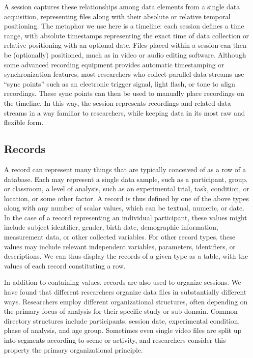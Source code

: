 \documentclass{sig-alternate}
\begin{document}
A session captures these relationships among data elements from a single data acquisition, representing files along with their absolute or relative temporal positioning.
The metaphor we use here is a timeline: each session defines a time range, with absolute timestamps representing the exact time of data collection or relative positioning with an optional date.
Files placed within a session can then be (optionally) positioned, much as in video or audio editing software.
Although some advanced recording equipment provides automatic timestamping or synchronization features, most researchers who collect parallel data streams use ``sync points'' such as an electronic trigger signal, light flash, or tone to align recordings.
These sync points can then be used to manually place recordings on the timeline.
In this way, the session represents recordings and related data streams in a way familiar to researchers, while keeping data in its most raw and flexible form.

\subsection{Records}

A record can represent many things that are typically conceived of as a row of a database.
Each may represent a single data sample, such as a participant, group, or classroom, a level of analysis, such as an experimental trial, task, condition, or location, or some other factor. 
A record is thus defined by one of the above types along with any number of scalar values, which can be textual, numeric, or date.
In the case of a record representing an individual participant, these values might include subject identifier, gender, birth date, demographic information, measurement data, or other collected variables.
For other record types, these values may include relevant independent variables, parameters, identifiers, or descriptions. 
We can thus display the records of a given type as a table, with the values of each record constituting a row.

In addition to containing values, records are also used to organize sessions.
We have found that different researchers organize data files in substantially different ways.
Researchers employ different organizational structures, often depending on the primary focus of analysis for their specific study or sub-domain.
Common directory structures include participants, session date, experimental condition, phase of analysis, and age group.
Sometimes even single video files are split up into segments according to scene or activity, and researchers consider this property the primary organizational principle.
\end{document}
